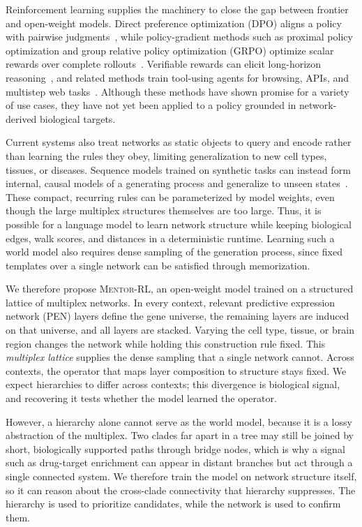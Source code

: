 Reinforcement learning supplies the machinery to close the gap between frontier and open-weight models. Direct preference optimization (DPO) aligns a policy with pairwise judgments~\cite{christiano2017rlhf, ouyang2022instructgpt, dpo}, while policy-gradient methods such as proximal policy optimization and group relative policy optimization (GRPO) optimize scalar rewards over complete rollouts~\cite{schulman2017proximal, shao2024deepseekmath}. Verifiable rewards can elicit long-horizon reasoning~\cite{guo2025deepseek}, and related methods train tool-using agents for browsing, APIs, and multistep web tasks~\cite{nakano2021webgpt, qin2023toolllm, putta2024agent}. Although these methods have shown promise for a variety of use cases, they have not yet been applied to a policy grounded in network-derived biological targets.

Current systems also treat networks as static objects to query and encode rather than learning the rules they obey, limiting generalization to new cell types, tissues, or diseases. Sequence models trained on synthetic tasks can instead form internal, causal models of a generating process and generalize to unseen states~\cite{othellogpt}. These compact, recurring rules can be parameterized by model weights, even though the large multiplex structures themselves are too large. Thus, it is possible for a language model to learn network structure while keeping biological edges, walk scores, and distances in a deterministic runtime. Learning such a world model also requires dense sampling of the generation process, since fixed templates over a single network can be satisfied through memorization.

We therefore propose \textsc{Mentor-RL}, an open-weight model trained on a structured lattice of multiplex networks. In every context, relevant predictive expression network (PEN) layers define the gene universe, the remaining layers are induced on that universe, and all layers are stacked. Varying the cell type, tissue, or brain region changes the network while holding this construction rule fixed. This \textit{multiplex lattice} supplies the dense sampling that a single network cannot. Across contexts, the operator that maps layer composition to structure stays fixed. We expect hierarchies to differ across contexts; this divergence is biological signal, and recovering it tests whether the model learned the operator.

However, a hierarchy alone cannot serve as the world model, because it is a lossy abstraction of the multiplex. Two clades far apart in a tree may still be joined by short, biologically supported paths through bridge nodes, which is why a signal such as drug-target enrichment can appear in distant branches but act through a single connected system. We therefore train the model on network structure itself, so it can reason about the cross-clade connectivity that hierarchy suppresses. The hierarchy is used to prioritize candidates, while the network is used to confirm them.

